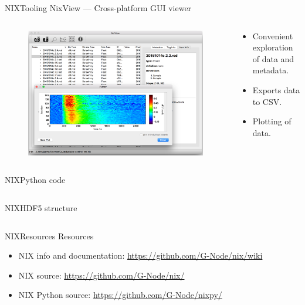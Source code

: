 \documentclass[10pt]{beamer}
\begin{document}
\begin{frame}{NIX}{Tooling}
    NixView --- Cross-platform GUI viewer

    \begin{columns}
        \begin{column}{0.5\textwidth}
            \begin{figure}
                \includegraphics[width=\textwidth]{nixview.pdf}
            \end{figure}
        \end{column}
        \begin{column}{0.5\textwidth}
            \begin{itemize}
                \item Convenient exploration of data and metadata.
                \item Exports data to CSV.\
                \item Plotting of data.
            \end{itemize}
        \end{column}
    \end{columns}
\end{frame}

\begin{frame}[fragile]{NIX}{Python code}
    \inputminted[fontsize=\footnotesize]{python}{./code/nixify-data.py}
\end{frame}

\begin{frame}[fragile]{NIX}{HDF5 structure}
    \inputminted[fontsize=\footnotesize]{shell}{./code/h5ls.out}
\end{frame}

\begin{frame}{NIX}{Resources}
    Resources

    \begin{itemize}
        \item NIX info and documentation: \url{https://github.com/G-Node/nix/wiki}
        \item NIX source: \url{https://github.com/G-Node/nix/}
        \item NIX Python source: \url{https://github.com/G-Node/nixpy/}
    \end{itemize}
\end{frame}
\end{document}
